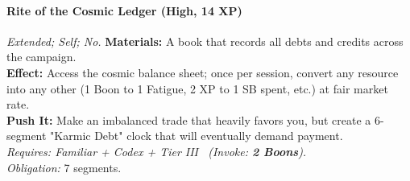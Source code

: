 \paragraph{Rite of the Cosmic Ledger (High, 14 XP)} \emph{Extended; Self; No.}
\textbf{Materials:} A book that records all debts and credits across the campaign. \\
\textbf{Effect:} Access the cosmic balance sheet; once per session, convert any resource into any other (1 Boon to 1 Fatigue, 2 XP to 1 SB spent, etc.) at fair market rate. \\
\textbf{Push It:} Make an imbalanced trade that heavily favors you, but create a 6-segment "Karmic Debt" clock that will eventually demand payment. \\
\emph{Requires: Familiar + Codex + Tier III \ (\textit{Invoke:} \textbf{2 Boons}).} \\
\emph{Obligation:} 7 segments.

